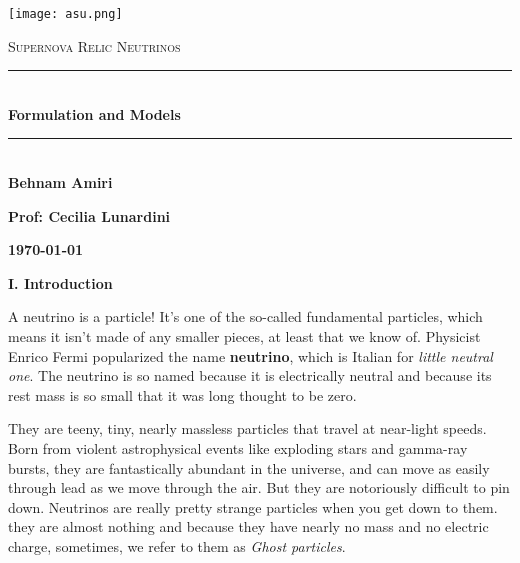 \documentclass[fleqn]{article}
\begin{document}
  \begin{titlepage}

    \newcommand{\HRule}{\rule{\linewidth}{0.5mm}}

    \center

    \begin{center}
      \texttt{[image: asu.png]}
    \end{center}

    \vline

    \textsc{\LARGE Supernova Relic Neutrinos}\\[1.5cm]

    \HRule \\[0.5cm]
    { \huge \bfseries Formulation and Models}\\[0.4cm] 
    \HRule \\[1.0cm]

    \textbf{Behnam Amiri}

    \bigbreak

    \textbf{Prof: Cecilia Lunardini}

    \bigbreak

    \textbf{{\large \today}\\[2cm]}

    \vfill

  \end{titlepage}

  \textbf{I. Introduction}

  \vspace{10px}

  A neutrino is a particle! It’s one of the so-called fundamental particles, which means it isn’t made of any 
  smaller pieces, at least that we know of. Physicist Enrico Fermi popularized the name \textbf{neutrino}, 
  which is Italian for \emph{little neutral one}. The neutrino is so named because it is electrically neutral 
  and because its rest mass is so small that it was long thought to be zero. \textcite{One}

  They are teeny, tiny, nearly massless particles that travel at near-light speeds. Born from violent astrophysical events 
  like exploding stars and gamma-ray bursts, they are fantastically abundant in the universe, and can move as easily through 
  lead as we move through the air. But they are notoriously difficult to pin down. Neutrinos are really pretty strange particles 
  when you get down to them. they are almost nothing and because they have nearly no mass and no electric charge, sometimes, 
  we refer to them as \emph{Ghost particles}.
\end{document}
